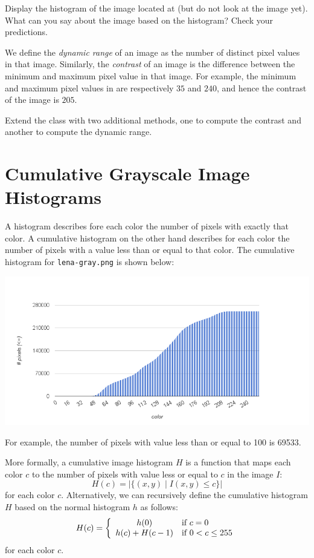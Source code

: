 \documentclass{book}
\begin{document}
\begin{exercise}
Display the histogram of the image located at \href{}{} (but do not look at the image yet). What can you say about the image based on the histogram? Check your predictions. 
\end{exercise}

We define the \emph{dynamic range} of an image as the number of distinct pixel values in that image. Similarly, the \emph{contrast} of an image is the difference between the minimum and maximum pixel value in that image. For example, the minimum and maximum pixel values in  are respectively $35$ and $240$, and hence the contrast of the image is $205$.

\begin{exercise}
Extend the class  with two additional methods, one to compute the contrast and another to compute the dynamic range.
\end{exercise}

\section{Cumulative Grayscale Image Histograms}
A histogram describes fore each color the number of pixels with exactly that color. A cumulative histogram on the other hand describes for each color the number of pixels with a value less than or equal to that color. The cumulative histogram for \texttt{lena-gray.png} is shown below:
\begin{center}
\includegraphics[scale=0.5]{lena-gray-cumulative-histogram.png}
\end{center}
For example, the number of pixels with value less than or equal to 100 is 69533.

More formally, a cumulative image histogram $H$ is a function that maps each color $c$ to the number of pixels with value less or equal to $c$ in the image $I$:
$$H(c) = |\{ (x, y) \mid I(x, y) \leq c \}|$$
for each color $c$. Alternatively, we can recursively define the cumulative histogram $H$ based on the normal histogram $h$ as follows:
$$H(c) = \left\{\begin{array}{c l}
  h(0) & \text{if $c = 0$}\\
  h(c) + H(c - 1) & \text{if $0 < c \leq 255$}\\
\end{array}
\right.$$
for each color $c$.
\end{document}
